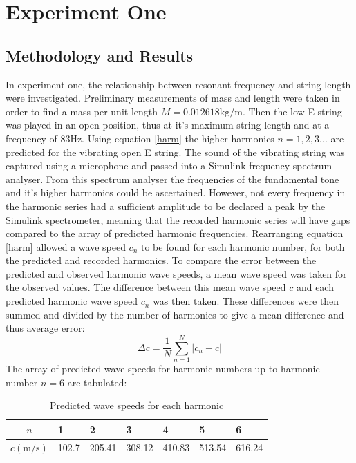 \documentclass[11pt]{article}
\begin{document}
    \section{Experiment One}
        \subsection{Methodology and Results}
            In experiment one, the relationship between resonant frequency and string length were investigated.
            Preliminary measurements of mass and length were taken in order to find a mass per unit length $M = 0.012618\si{\kilogram\per\meter}$.
            Then the low E string was played in an open position, thus at it's maximum string length and at a frequency of $83\si{\hertz}$.
            Using equation \ref{harm} the higher harmonics $n = 1, 2 ,3 ...$ are predicted for the vibrating open E string.
            The sound of the vibrating string was captured using a microphone and passed into a Simulink frequency spectrum analyser.
            From this spectrum analyser the frequencies of the fundamental tone and it's higher harmonics could be ascertained.
            However, not every frequency in the harmonic series had a sufficient amplitude to be declared a peak by the Simulink spectrometer, meaning that the recorded harmonic series will have gaps compared to the array of predicted harmonic frequencies.
            Rearranging equation \ref{harm} allowed a wave speed $c_n$ to be found for each harmonic number, for both the predicted and recorded harmonics.
            To compare the error between the predicted and observed harmonic wave speeds, a mean wave speed was taken for the observed values.
            The difference between this mean wave speed $c$ and each predicted harmonic wave speed $c_n$ was then taken.
            These differences were then summed and divided by the number of harmonics to give a mean difference and thus average error:
            \begin{equation}
                \Delta c = \frac{1}{N}\sum_{n=1}^{N} | c_n - c |
            \end{equation}
            The array of predicted wave speeds for harmonic numbers up to harmonic number $n=6$ are tabulated:
            \begin{table}[H]
                \centering
                \begin{tabular}{c | l l l l l l}
                    \hline
                    $n$ & 1 & 2 & 3 & 4 & 5 & 6 \\
                    \hline
                    $c(\si{\meter\per\second})$ & 102.7 & 205.41 & 308.12 & 410.83 & 513.54 & 616.24 \\
                    \hline
                \end{tabular}
                \caption{Predicted wave speeds for each harmonic}
            \end{table}
\end{document}
